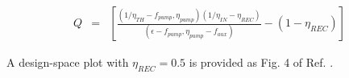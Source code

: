 \begin{eqnarray} 
\label{e-2-55} 
Q & = & \left[\frac{(1/\eta_{TH} - f_{pump} , \eta_{pump})(1/\eta_{IN} - \eta_{REC})}{(\epsilon - f_{pump} , \eta_{pump} - f_{aux})} - (1 - \eta_{REC}) \right] 
\end{eqnarray}

A design-space plot with $\eta_{REC} = 0.5$ is provided as Fig. 4 of Ref. \cite{Miller2007}. \\




